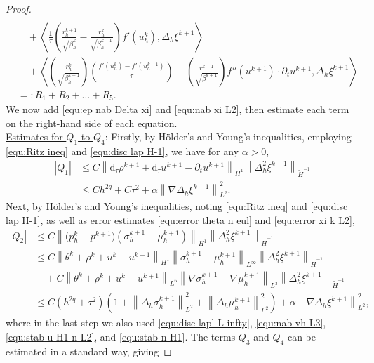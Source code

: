 \documentclass[11pt, reqno]{amsart}
\theoremstyle{definition}
\numberwithin{equation}{section}
\newcommand{\dtt}{\mathrm{d}_\tau}
\newcommand{\norm}[2]{\left\|{#1}\right\|_{#2}}
\newcommand{\inpro}[2]{\left\langle#1,#2\right\rangle}
\newcommand{\abs}[1]{\left|{#1}\right|}
\begin{document}
\begin{proof}
\begin{align}
    \nonumber\\
    &\quad
    +
    \inpro{\frac{1}{\tau} \left(\frac{r_h^{k+1}}{\sqrt{\beta_h^k}} - \frac{r_h^k}{\sqrt{\beta_h^{k-1}}} \right) f'(u_h^k)}{\Delta_h \xi^{k+1}}
    \nonumber\\
    &\quad
    +
    \inpro{\left(\frac{r_h^k}{\sqrt{\beta_h^{k-1}}}\right) \left(\frac{f'(u_h^k)-f'(u_h^{k-1})}{\tau}\right) - \left(\frac{r^{k+1}}{\sqrt{\beta^{k+1}}} \right) f''(u^{k+1}) \cdot \partial_t u^{k+1}}{\Delta_h \xi^{k+1}}
    \nonumber\\
    &=:R_1+R_2+\ldots+R_5.
\end{align}
We now add \eqref{equ:ep nab Delta xi} and \eqref{equ:nab xi L2}, then estimate each term on the right-hand side of each equation. 
\\[2ex]
\underline{Estimates for $Q_1$ to $Q_4$}: Firstly, by H\"older's and Young's inequalities, employing \eqref{equ:Ritz ineq} and \eqref{equ:disc lap H-1},  we have for any $\alpha>0$,
\begin{align*}
    \abs{Q_1}
    &\leq
    C \norm{\dtt \rho^{k+1}+\dtt u^{k+1}-\partial_t u^{k+1}}{H^1} \norm{\Delta_h^2 \xi^{k+1}}{\widetilde{H}^{-1}}
    \\
    &\leq
    Ch^{2q}+C\tau^2 + \alpha \norm{\nabla\Delta_h \xi^{k+1}}{L^2}^2.
\end{align*}
Next, by H\"older's and Young's inequalities, noting \eqref{equ:Ritz ineq} and \eqref{equ:disc lap H-1}, as well as error estimates \eqref{equ:error theta n eul} and \eqref{equ:error xi k L2},
\begin{align*}
    \abs{Q_2}
    &\leq
    C\norm{\big(p_h^k-p^{k+1}\big) (\sigma_h^{k+1}-\mu_h^{k+1})}{H^1}  \norm{\Delta_h^2 \xi^{k+1}}{\widetilde{H}^{-1}}
    \\
    &\leq
    C\norm{\theta^k+\rho^k+u^k-u^{k+1}}{H^1} \norm{\sigma_h^{k+1}-\mu_h^{k+1}}{L^\infty} \norm{\Delta_h^2 \xi^{k+1}}{\widetilde{H}^{-1}}
    \\
    &\quad
    +
    C\norm{\theta^k+\rho^k+u^k-u^{k+1}}{L^6} \norm{\nabla\sigma_h^{k+1}- \nabla\mu_h^{k+1}}{L^3} \norm{\Delta_h^2 \xi^{k+1}}{\widetilde{H}^{-1}}
    \\
    &\leq
    C(h^{2q}+\tau^2) \left(1+\norm{\Delta_h \sigma_h^{k+1}}{L^2}^2 + \norm{\Delta_h \mu_h^{k+1}}{L^2}^2 \right) 
    +
    \alpha \norm{\nabla\Delta_h \xi^{k+1}}{L^2}^2,
\end{align*}
where in the last step we also used \eqref{equ:disc lapl L infty}, \eqref{equ:nab vh L3}, \eqref{equ:stab u H1 n L2}, and \eqref{equ:stab n H1}. The terms $Q_3$ and $Q_4$ can be estimated in a standard way, giving

\end{proof}
\end{document}
